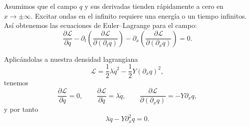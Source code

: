 \documentclass[11pt,a4paper]{article}
\begin{document}
Asumimos que el campo $q$ y sus derivadas tienden rápidamente a cero en $x\to\pm\infty$. Excitar ondas en el infinito requiere una energía o un tiempo infinitos. Así obtenemos las ecuaciones de Euler--Lagrange para el campo:
\[
  \frac{\partial\mathcal L}{\partial q}
  -\partial_t\left(
    \frac{\partial\mathcal L}{\partial(\partial_tq)}
  \right)
  -\partial_x\left(
    \frac{\partial\mathcal L}{\partial(\partial_xq)}
  \right)=0.
\]

Aplicándolas a nuestra densidad lagrangiana
\[
  \mathcal L
  =\frac12\lambda\dot q^2
   -\frac12Y(\partial_xq)^2,
\]
tenemos
\[
  \frac{\partial\mathcal L}{\partial q}=0,
  \qquad
  \frac{\partial\mathcal L}{\partial\dot q}=\lambda\dot q,
  \qquad
  \frac{\partial\mathcal L}{\partial(\partial_xq)}=-Y\partial_xq,
\]
y por tanto
\[
  \lambda\ddot q-Y\partial_x^2q=0.
\]
\end{document}
